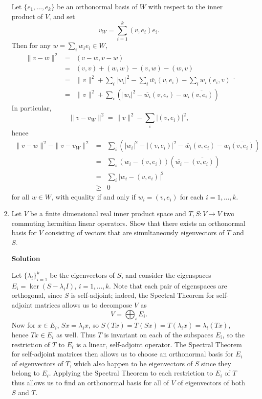 \documentclass{article}
\begin{document}
\begin{enumerate}
Let \(\{e_1, \ldots, e_k\}\) be an orthonormal basis of \(W\) with respect to the inner product of \(V\), and set
\[v_W = \sum_{i = 1}^k (v,e_i) e_i.\]
Then for any \(w = \sum_i w_i e_i \in W\),
\[\begin{array}{rcl} \|v - w\|^2
  & = & (v - w, v - w) \\
  & = & (v,v) + (w,w) - (v,w) - (w,v) \\
  & = & \|v\|^2 + \sum_i |w_i|^2 - \sum_i \overline{w_i} (v,e_i) - \sum_i w_i (e_i,v) \\
  & = & \|v\|^2 + \sum_i \left( |w_i|^2 - \overline{w_i} (v,e_i) - w_i \overline{(v,e_i)} \right)
  \end{array}.\]
In particular,
\[\|v - v_W\|^2 = \|v\|^2 - \sum_i |(v,e_i)|^2,\]
hence
\[\begin{array}{rcl} \|v - w\|^2 - \|v - v_W\|^2
  & = & \sum_i \left( |w_i|^2 + |(v,e_i)|^2 - \overline{w_i} (v,e_i) - w_i \overline{(v,e_i)} \right) \\
  & = & \sum_i \left( w_i - (v,e_i) \right) \left( \overline{w_i} - \overline{(v,e_i)} \right) \\
  & = & \sum_i \left| w_i - (v,e_i) \right|^2 \\
  & \geq & 0
  \end{array}\]
for all \(w \in W\), with equality if and only if \(w_i = (v,e_i)\) for each \(i = 1, \ldots, k\).



\item Let \(V\) be a finite dimensional real inner product space and \(T,S : V \to V\) two commuting hermitian linear operators.  Show that there exists an orthonormal basis for \(V\) consisting of vectors that are simultaneously eigenvectors of \(T\) and \(S\).

{\bf Solution}

Let \(\{\lambda_i\}_{i = 1}^k\) be the eigenvectors of \(S\), and consider the eigenspaces \(E_i = \ker(S - \lambda_i I)\), \(i = 1, \ldots, k\).  Note that each pair of eigenspaces are orthogonal, since \(S\) is self-adjoint; indeed, the Spectral Theorem for self-adjoint matrices allows us to decompose \(V\) as
\[V = \bigoplus_i E_i.\]
Now for \(x \in E_i\), \(Sx = \lambda_i x\), so \(S(Tx) = T(Sx) = T(\lambda_i x) = \lambda_i(Tx)\), hence \(Tx \in E_i\) as well.  Thus \(T\) is invariant on each of the subspaces \(E_i\), so the restriction of \(T\) to \(E_i\) is a linear, self-adjoint operator.  The Spectral Theorem for self-adjoint matrices then allows us to choose an orthonormal basis for \(E_i\) of eigenvectors of \(T\), which also happen to be eigenvectors of \(S\) since they belong to \(E_i\).  Applying the Spectral Theorem to each restriction to \(E_i\) of \(T\) thus allows us to find an orthonormal basis for all of \(V\) of eigenvectors of both \(S\) and \(T\).



\end{enumerate}
\end{document}
